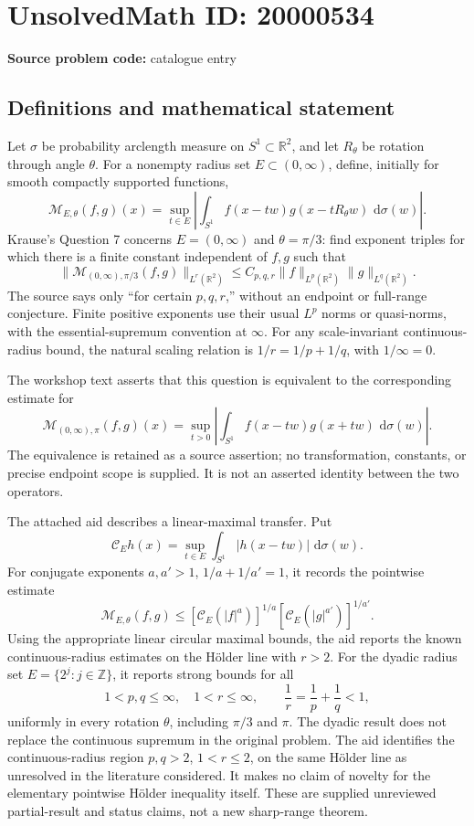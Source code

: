 \documentclass[11pt]{article}
\newcommand{\Z}{\mathbb{Z}}
\newcommand{\R}{\mathbb{R}}
\newcommand{\dd}{\,\mathrm{d}}
\begin{document}
\section*{UnsolvedMath ID: 20000534}
\textbf{Source problem code:} catalogue entry
\subsection{Definitions and mathematical statement}
Let \(\sigma\) be probability arclength measure on \(S^1\subset\R^2\), and let \(R_\theta\) be rotation through angle \(\theta\). For a nonempty radius set \(E\subset(0,\infty)\), define, initially for smooth compactly supported functions,
\[
\mathcal M_{E,\theta}(f,g)(x)=\sup_{t\in E}
\left|\int_{S^1}f(x-tw)g(x-tR_\theta w)\,\dd\sigma(w)\right|.
\]
Krause's Question 7 concerns \(E=(0,\infty)\) and \(\theta=\pi/3\): find exponent triples for which there is a finite constant independent of \(f,g\) such that
\[
\|\mathcal M_{(0,\infty),\pi/3}(f,g)\|_{L^r(\R^2)}
\leq C_{p,q,r}\|f\|_{L^p(\R^2)}\|g\|_{L^q(\R^2)}.
\]
The source says only ``for certain \(p,q,r\),'' without an endpoint or full-range conjecture. Finite positive exponents use their usual \(L^p\) norms or quasi-norms, with the essential-supremum convention at \(\infty\). For any scale-invariant continuous-radius bound, the natural scaling relation is \(1/r=1/p+1/q\), with \(1/\infty=0\).

The workshop text asserts that this question is equivalent to the corresponding estimate for
\[
\mathcal M_{(0,\infty),\pi}(f,g)(x)=\sup_{t>0}
\left|\int_{S^1}f(x-tw)g(x+tw)\,\dd\sigma(w)\right|.
\]
The equivalence is retained as a source assertion; no transformation, constants, or precise endpoint scope is supplied. It is not an asserted identity between the two operators.

The attached aid describes a linear-maximal transfer. Put
\[
\mathcal C_E h(x)=\sup_{t\in E}\int_{S^1}|h(x-tw)|\,\dd\sigma(w).
\]
For conjugate exponents \(a,a'>1\), \(1/a+1/a'=1\), it records the pointwise estimate
\[
\mathcal M_{E,\theta}(f,g)
\leq[\mathcal C_E(|f|^a)]^{1/a}
[\mathcal C_E(|g|^{a'})]^{1/a'}.
\]
Using the appropriate linear circular maximal bounds, the aid reports the known continuous-radius estimates on the H\"older line with \(r>2\). For the dyadic radius set \(E=\{2^j:j\in\Z\}\), it reports strong bounds for all
\[
1<p,q\leq\infty,\quad1<r\leq\infty,\qquad
\frac1r=\frac1p+\frac1q<1,
\]
uniformly in every rotation \(\theta\), including \(\pi/3\) and \(\pi\). The dyadic result does not replace the continuous supremum in the original problem. The aid identifies the continuous-radius region \(p,q>2\), \(1<r\leq2\), on the same H\"older line as unresolved in the literature considered. It makes no claim of novelty for the elementary pointwise H\"older inequality itself. These are supplied unreviewed partial-result and status claims, not a new sharp-range theorem.
\end{document}
